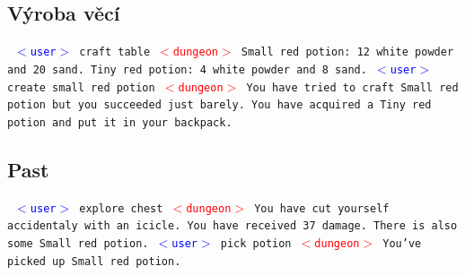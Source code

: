 \documentclass[11pt, a4paper]{article}
\newenvironment{example}%
{\smallskip\noindent\ignorespaces\obeylines\tt}%
{\smallskip\par\noindent
\ignorespacesafterend}
\def\user{\textcolor{blue}{$<$user$>$ }}
\def\dung{\textcolor{red}{$<$dungeon$>$ }}
\begin{document}
\subsection{Výroba věcí}
\begin{example}
\user craft table
\dung Small red potion: 12 white powder and 20 sand. Tiny red potion: 4 white powder and 8 sand.
\user create small red potion
\dung You have tried to craft Small red potion but you succeeded just barely. You have acquired a Tiny red potion and put it in your backpack.
\end{example}
\subsection{Past}
\begin{example}
\user explore chest
\dung You have cut yourself accidentaly with an icicle. You have received 37 damage. There is also some Small red potion.
\user pick potion
\dung You've picked up Small red potion.
\end{example}
\end{document}
